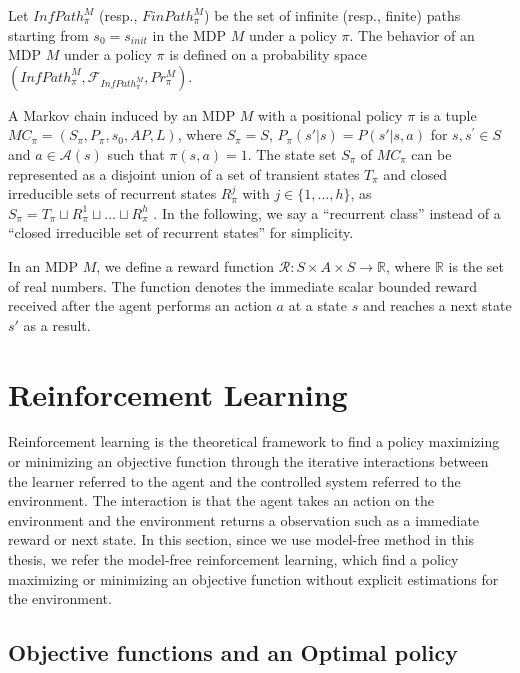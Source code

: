 Let $InfPath^{M}_{\pi}$ (resp., $FinPath^{M}_{\pi}$) be the set of infinite (resp., finite) paths starting from $s_0=s_{init}$ in the MDP $M$ under a policy $\pi$. The behavior of an MDP $M$ under a policy $\pi$ is defined on a probability space $(InfPath^{M}_{\pi}, \mathcal{F}_{InfPath^{M}_{\pi}}, Pr^{M}_{\pi})$. %

\begin{definition}
  A Markov chain induced by an MDP $M$ with a positional policy $\pi$ is a tuple $MC_{\pi} = (S_{\pi},P_{\pi},s_0,AP,L)$, where $S_{\pi} = S$, $P_{\pi}(s'|s) = P(s'|s,a)$ for $s, s^{\prime} \in S$ and $a \in \mathcal{A}(s)$ such that $\pi(s,a) = 1$.
  The state set $S_{\pi}$ of $MC_{\pi}$ can be represented as a disjoint union of a set of transient states $T_{\pi}$ and closed irreducible sets of recurrent states $R^j_{\pi}$ with $j \in \{ 1, \ldots ,h \}$, as $ S_{\pi} = T_{\pi} \sqcup R^1_{\pi} \sqcup \ldots \sqcup R^h_{\pi} $ \cite{ESS}.
  In the following, we say a ``recurrent class'' instead of a ``closed irreducible set of recurrent states'' for simplicity.
\end{definition}

In an MDP $M$, we define a reward function $\mathcal{R}:S \times A \times S \rightarrow \mathbb{R}$, where $\mathbb{R}$ is the set of real numbers. The function denotes the immediate scalar bounded reward received after the agent performs an action $a$ at a state $s$ and reaches a next state $s'$ as a result.

\section{Reinforcement Learning}

Reinforcement learning is the theoretical framework to find a policy maximizing or minimizing an objective function through the iterative interactions between the learner referred to the agent and the controlled system referred to the environment. The interaction is that the agent takes an action on the environment and the environment returns a observation such as a immediate reward or next state. In this section, since we use model-free method in this thesis, we refer the model-free reinforcement learning, which find a policy maximizing or minimizing an objective function without explicit estimations for the environment.

\subsection{Objective functions and an Optimal policy}

